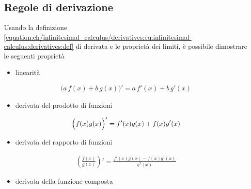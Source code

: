 \documentclass[letterpaper,10pt,italian]{jupyterBook}
\begin{document}
\subsection{Regole di derivazione}
\label{\detokenize{ch/infinitesimal_calculus/derivatives:regole-di-derivazione}}\label{\detokenize{ch/infinitesimal_calculus/derivatives:infinitesimal-calculus-derivatives-rules}}
\sphinxAtStartPar
Usando la definizione \eqref{equation:ch/infinitesimal_calculus/derivatives:eq:infinitesimal-calculus:derivatives:def} di derivata e le proprietà dei limiti, è possibile dimostrare le seguenti proprietà
\begin{itemize}
\item {} 
\sphinxAtStartPar
linearità

\end{itemize}
\begin{equation}\label{equation:ch/infinitesimal_calculus/derivatives:infinitesimal-calculus:derivatives:rules:linearity}
\begin{split}\big( a \, f(x) + b \, g(x) \big)' = a \, f'(x) + b \, g'(x)\end{split}
\end{equation}\begin{itemize}
\item {} 
\sphinxAtStartPar
derivata del prodotto di funzioni

\end{itemize}
\begin{equation}\label{equation:ch/infinitesimal_calculus/derivatives:infinitesimal-calculus:derivatives:rules:product}
\begin{split}\Bigl( f(x) g(x) \Bigr)' = f'(x) g(x) + f(x) g'(x)\end{split}
\end{equation}\begin{itemize}
\item {} 
\sphinxAtStartPar
derivata del rapporto di funzioni

\end{itemize}
\begin{equation}\label{equation:ch/infinitesimal_calculus/derivatives:infinitesimal-calculus:derivatives:rules:division}
\begin{split}\left( \frac{f(x)}{g(x)} \right)' = \frac{f'(x) g(x) - f(x) g'(x)}{g^2(x)}\end{split}
\end{equation}\begin{itemize}
\item {} 
\sphinxAtStartPar
derivata della funzione composta

\end{itemize}
\end{document}
